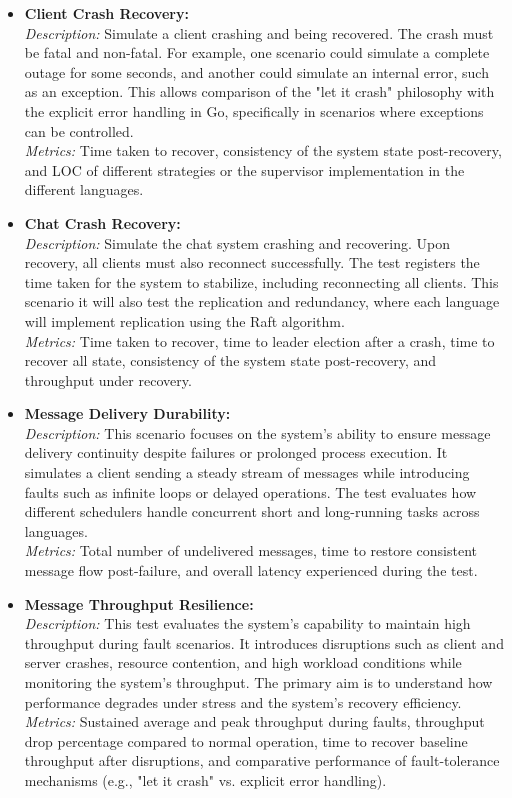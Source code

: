 \begin{itemize}
    \item \textbf{Client Crash Recovery:} \\
    \textit{Description:} Simulate a client crashing and being recovered. The crash must be fatal and non-fatal. For example, one scenario could simulate a complete outage for some seconds, and another could simulate an internal error, such as an exception. This allows comparison of the "let it crash" philosophy with the explicit error handling in Go, specifically in scenarios where exceptions can be controlled. \\
    \textit{Metrics:} Time taken to recover, consistency of the system state post-recovery, and \gls{LOC} of different strategies or the supervisor implementation in the different languages.
    
    \item \textbf{Chat Crash Recovery:} \\
    \textit{Description:} Simulate the chat system crashing and recovering. Upon recovery, all clients must also reconnect successfully. The test registers the time taken for the system to stabilize, including reconnecting all clients. This scenario it will also test the replication and redundancy, where each language will implement replication using the Raft algorithm. \\
    \textit{Metrics:} Time taken to recover, time to leader election after a crash, time to recover all state, consistency of the system state post-recovery, and throughput under recovery.
    
    \item \textbf{Message Delivery Durability:} \\
    \textit{Description:} This scenario focuses on the system's ability to ensure message delivery continuity despite failures or prolonged process execution. It simulates a client sending a steady stream of messages while introducing faults such as infinite loops or delayed operations. The test evaluates how different schedulers handle concurrent short and long-running tasks across languages. \\
    \textit{Metrics:} Total number of undelivered messages, time to restore consistent message flow post-failure, and overall latency experienced during the test.
    
    \item \textbf{Message Throughput Resilience:} \\
    \textit{Description:} This test evaluates the system's capability to maintain high throughput during fault scenarios. It introduces disruptions such as client and server crashes, resource contention, and high workload conditions while monitoring the system's throughput. The primary aim is to understand how performance degrades under stress and the system's recovery efficiency. \\
    \textit{Metrics:} Sustained average and peak throughput during faults, throughput drop percentage compared to normal operation, time to recover baseline throughput after disruptions, and comparative performance of fault-tolerance mechanisms (e.g., "let it crash" vs. explicit error handling).
    

\end{itemize}
